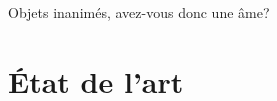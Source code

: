 \begin{savequote}[75mm] 
Objets inanimés, avez-vous donc une âme?
\end{savequote}

\chapter{État de l'art}


%
%
%
%
%
%
%
%
%
